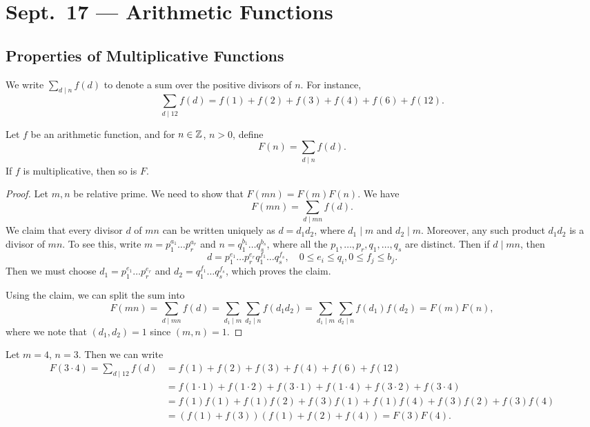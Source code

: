 \chapter{Sept.~17 --- Arithmetic Functions}

\section{Properties of Multiplicative Functions}

\begin{remark}
  We write $\sum_{d \mid n} f(d)$
  to denote a sum over the positive
  divisors of $n$. For instance,
  \[
    \sum_{d \mid 12} f(d)
    = f(1) + f(2) + f(3) + f(4) + f(6) + f(12).
  \]
\end{remark}

\begin{theorem}\label{thm:sum-mult}
  Let $f$ be an arithmetic function, and
  for $n \in \mathbb{Z}$, $n > 0$, define
  \[
    F(n) = \sum_{d \mid n} f(d).
  \]
  If $f$ is multiplicative, then so is
  $F$.
\end{theorem}

\begin{proof}
  Let $m, n$ be relative prime. We need
  to show that $F(mn) = F(m)F(n)$. We have
  \[
    F(mn) = \sum_{d \mid mn} f(d).
  \]
  We claim that every divisor $d$ of
  $mn$ can be written uniquely as
  $d = d_1 d_2$, where $d_1 \mid m$ and
  $d_2 \mid m$. Moreover, any such
  product $d_1 d_2$ is a divisor of $mn$.
  To see this, write
  $m = p_1^{a_1} \dots p_r^{a_r}$ and
  $n = q_1^{b_1} \dots q_s^{b_s}$, where
  all the $p_1, \dots, p_r, q_1, \dots, q_s$
  are distinct. Then if $d \mid mn$, then
  \[
    d = p_1^{e_1} \dots p_r^{e_r} q_1^{f_1} \dots q_s^{f_s},
    \quad 0 \le e_i \le q_i, 0 \le f_j \le b_j.
  \]
  Then we must choose $d_1 = p_1^{e_1} \dots p_r^{e_r}$
  and $d_2 = q_1^{f_1} \dots q_s^{f_s}$,
  which proves the claim.

  Using the claim, we can split the sum
  into
  \[
    F(mn) = \sum_{d \mid mn} f(d)
    = \sum_{d_1 \mid m} \sum_{d_2 \mid n} f(d_1 d_2)
    = \sum_{d_1 \mid m} \sum_{d_2 \mid n} f(d_1) f(d_2)
    = F(m) F(n),
  \]
  where we note that $(d_1, d_2) = 1$
  since $(m, n) = 1$.
\end{proof}

\begin{example}
  Let $m = 4$, $n = 3$. Then we can write
  \begin{align*}
    F(3 \cdot 4)
    = \sum_{d \mid 12}
    f(d)
    &= f(1) + f(2) + f(3) + f(4) + f(6) + f(12) \\
    &= f(1 \cdot 1) + f(1 \cdot 2) + f(3 \cdot 1) + f(1 \cdot 4) + f(3 \cdot 2) + f(3 \cdot 4) \\
    &= f(1) f(1) + f(1) f(2) + f(3) f(1) + f(1) f(4) + f(3) f(2) + f(3) f(4) \\
    &= (f(1) + f(3))(f(1) + f(2) + f(4))
    = F(3) F(4).
  \end{align*}
\end{example}

